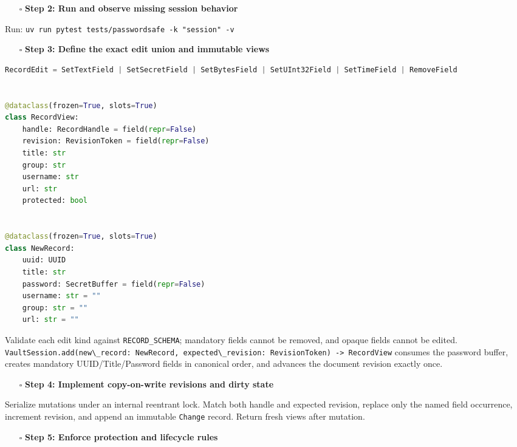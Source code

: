 \documentclass[
  letterpaper,
]{article}
\newcommand{\passthrough}[1]{#1}
\providecommand{\tightlist}{%
  \setlength{\itemsep}{0pt}\setlength{\parskip}{0pt}}
\begin{document}
\begin{itemize}
\tightlist
\item[$\square$]
  \textbf{Step 2: Run and observe missing session behavior}
\end{itemize}

Run: \passthrough{\lstinline!uv run pytest tests/passwordsafe -k "session" -v!}

\begin{itemize}
\tightlist
\item[$\square$]
  \textbf{Step 3: Define the exact edit union and immutable views}
\end{itemize}

\begin{lstlisting}[language=Python]
RecordEdit = SetTextField | SetSecretField | SetBytesField | SetUInt32Field | SetTimeField | RemoveField


@dataclass(frozen=True, slots=True)
class RecordView:
    handle: RecordHandle = field(repr=False)
    revision: RevisionToken = field(repr=False)
    title: str
    group: str
    username: str
    url: str
    protected: bool


@dataclass(frozen=True, slots=True)
class NewRecord:
    uuid: UUID
    title: str
    password: SecretBuffer = field(repr=False)
    username: str = ""
    group: str = ""
    url: str = ""
\end{lstlisting}

Validate each edit kind against \nolinkurl{RECORD_SCHEMA}; mandatory fields cannot be removed, and opaque fields cannot
be edited.
\passthrough{\lstinline!VaultSession.add(new\_record: NewRecord, expected\_revision: RevisionToken) -> RecordView!}
consumes the password buffer, creates mandatory UUID/Title/Password fields in canonical order, and advances the document
revision exactly once.

\begin{itemize}
\tightlist
\item[$\square$]
  \textbf{Step 4: Implement copy-on-write revisions and dirty state}
\end{itemize}

Serialize mutations under an internal reentrant lock. Match both handle and expected revision, replace only the named
field occurrence, increment revision, and append an immutable \passthrough{\lstinline!Change!} record. Return fresh
views after mutation.

\begin{itemize}
\tightlist
\item[$\square$]
  \textbf{Step 5: Enforce protection and lifecycle rules}
\end{itemize}
\end{document}
